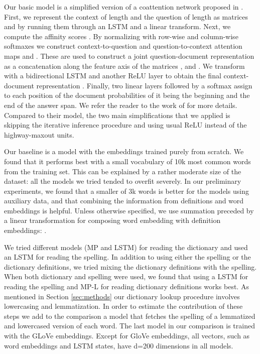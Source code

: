 Our basic model is a simplified version of a coattention network proposed in \citep{xiong2017dynamic}. First, we represent the context of length  and the question of length  as matrices  and  by running them through an LSTM and a linear transform. Next, we compute the affinity scores . By normalizing  with row-wise and column-wise softmaxes we construct context-to-question and question-to-context attention maps  and . These are used to construct a joint question-document representation  as a concatenation along the feature axis of the matrices ,  and . We transform  with a bidirectional LSTM and another ReLU\citep{glorot2011deep} layer to obtain the final context-document representation . Finally, two linear layers followed by a softmax assign to each position of the document probabilities of it being the beginning and the end of the answer span. We refer the reader to the work of \citet{xiong2017dynamic} for more details. Compared to their model, the two main simplifications that we applied is skipping the iterative inference procedure and using usual ReLU instead of the highway-maxout units.


Our baseline is a model with the embeddings trained purely from scratch. We found that it performs best with a small vocabulary of 10k most common words from the training set. This can be explained by a rather moderate size of the dataset: all the models we tried tended to overfit severely. In our preliminary experiments, we found that a smaller  of 3k words is better for the models using auxiliary data, and that combining the information from definitions and word embeddings is helpful.
Unless otherwise specified, we use summation preceded by a linear transformation for composing word embedding with definition embeddings: . 

We tried different models (MP and LSTM) for reading the dictionary and used an LSTM for reading the spelling.  In addition to using either the spelling or the dictionary definitions, we tried mixing the dictionary definitions with the spelling. When both dictionary and spelling were used, we found that using a LSTM for reading the spelling and MP-L for reading dictionary definitions works best. 
As mentioned in Section \ref{sec:methods} our dictionary lookup procedure involves lowercasing and lemmatization. In order to estimate the contribution of these steps we add to the comparison a model that fetches the spelling of a lemmatized and lowercased version of each word. The last model in our comparison is trained with the GLoVe embeddings. Except for GloVe embeddings, all vectors, such as word embeddings and LSTM states, have d=200 dimensions in all models.

